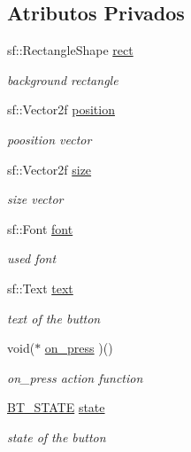 \subsection*{Atributos Privados}
\begin{DoxyCompactItemize}
\item 
sf\+::\+Rectangle\+Shape \hyperlink{classButton_a8d1ded1e184e2495c36160c885574a1c}{rect}
\begin{DoxyCompactList}\small\item\em background rectangle \end{DoxyCompactList}\item 
sf\+::\+Vector2f \hyperlink{classButton_afd3823c96d76e1152fda9fc080f45b01}{position}
\begin{DoxyCompactList}\small\item\em poosition vector \end{DoxyCompactList}\item 
sf\+::\+Vector2f \hyperlink{classButton_ae2858ccb82273767d44ec2bc952dd07c}{size}
\begin{DoxyCompactList}\small\item\em size vector \end{DoxyCompactList}\item 
sf\+::\+Font \hyperlink{classButton_ab6290d275363f4b0e133eec450845ca1}{font}
\begin{DoxyCompactList}\small\item\em used font \end{DoxyCompactList}\item 
sf\+::\+Text \hyperlink{classButton_aadf908b0777f2ae5c28d949fda3384c1}{text}
\begin{DoxyCompactList}\small\item\em text of the button \end{DoxyCompactList}\item 
void($\ast$ \hyperlink{classButton_ae9295b79451566476a9d2e563d0e7ce2}{on\+\_\+press} )()
\begin{DoxyCompactList}\small\item\em on\+\_\+press action function \end{DoxyCompactList}\item 
\hyperlink{button_8h_a40b271baa2a62e00c1925f51d7698146}{B\+T\+\_\+\+S\+T\+A\+TE} \hyperlink{classButton_aa405a1238e29323bbdcf1c08f83d3f0f}{state}
\begin{DoxyCompactList}\small\item\em state of the button \end{DoxyCompactList}\end{DoxyCompactItemize}


